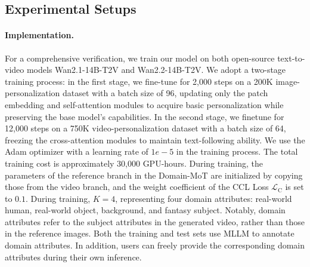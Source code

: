 \documentclass{llmxive}
\begin{document}
\subsection{Experimental Setups}
\paragraph{\textbf{Implementation.}}  For a comprehensive verification, we train our model on both open-source text-to-video models Wan2.1-14B-T2V \cite{wan2025wan} and Wan2.2-14B-T2V. We adopt a two-stage training process: in the first stage, we fine-tune for 2,000 steps on a 200K image-personalization dataset with a batch size of 96, updating only the patch embedding and self-attention modules to acquire basic personalization while preserving the base model’s capabilities. In the second stage, we finetune for 12,000 steps on a 750K video-personalization dataset with a batch size of 64, freezing the cross-attention modules to maintain text-following ability.  We use the Adam optimizer with a learning rate of $1e-5$ in the training process. The total training cost is approximately 30,000 GPU-hours. During training, the parameters of the reference branch in the Domain-MoT are initialized by copying those from the video branch, and the weight coefficient of the CCL Loss $\mathcal{L}_{\mathrm{C}}$ is set to $0.1$. During training, $K=4$, representing four domain attributes: real-world human, real-world object, background, and fantasy subject. Notably, domain attributes refer to the subject attributes in the generated video, rather than those in the reference images. Both the training and test sets use MLLM to annotate domain attributes. In addition, users can freely provide the corresponding domain attributes during their own inference.

\end{document}
